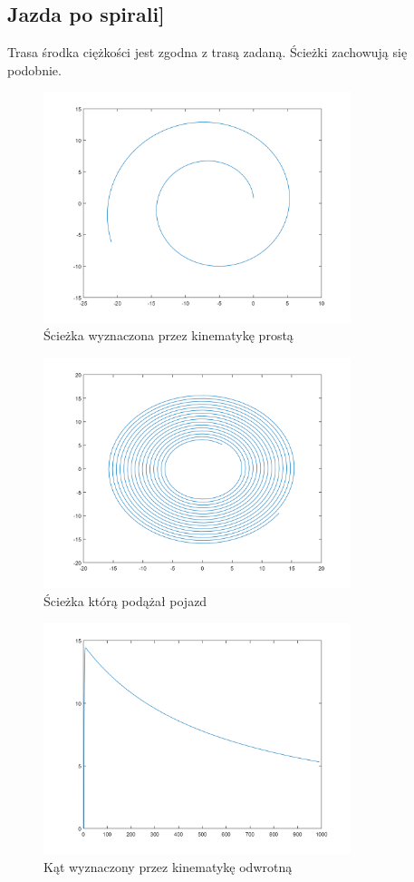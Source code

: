 \documentclass[a4paper, 12pt]{report}
\begin{document}
			\subsection{Jazda po spirali]}
				Trasa środka ciężkości jest zgodna z trasą zadaną. Ścieżki zachowują się podobnie. 
				\begin{figure}[H]
					\centering
					\includegraphics[width = 0.8\textwidth]{./AP/img/rev/spiral_in_1.png}
					\caption{Ścieżka wyznaczona przez kinematykę prostą}
				\end{figure}
				\begin{figure}[H]
					\centering
					\includegraphics[width = 0.8\textwidth]{./AP/img/rev/spiral_in_2.png}
					\caption{Ścieżka którą podążał pojazd}
				\end{figure}
				\begin{figure}[H]
					\centering
					\includegraphics[width = 0.8\textwidth]{./AP/img/rev/spiral_in_3.png}
					\caption{Kąt wyznaczony przez kinematykę odwrotną}
				\end{figure}
\end{document}
